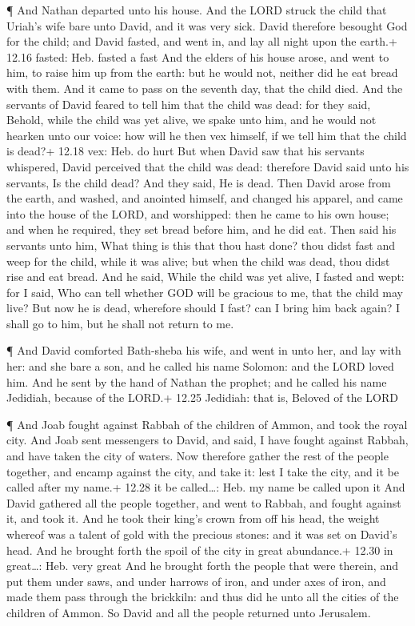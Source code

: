  ¶ And Nathan departed unto his house. And the LORD struck
the child that Uriah's wife bare unto David, and it was very sick.
 David therefore besought God for the child; and David
fasted, and went in, and lay all night upon the earth.+ 12.16 fasted:
Heb. fasted a fast  And the elders of his house arose, and
went to him, to raise him up from the earth: but he would not, neither
did he eat bread with them.  And it came to pass on the
seventh day, that the child died. And the servants of David feared to
tell him that the child was dead: for they said, Behold, while the child
was yet alive, we spake unto him, and he would not hearken unto our
voice: how will he then vex himself, if we tell him that the child is
dead?+ 12.18 vex: Heb. do hurt  But when David saw that his
servants whispered, David perceived that the child was dead: therefore
David said unto his servants, Is the child dead? And they said, He is
dead.  Then David arose from the earth, and washed, and
anointed himself, and changed his apparel, and came into the house of
the LORD, and worshipped: then he came to his own house; and when he
required, they set bread before him, and he did eat.  Then
said his servants unto him, What thing is this that thou hast done? thou
didst fast and weep for the child, while it was alive; but when the
child was dead, thou didst rise and eat bread.  And he
said, While the child was yet alive, I fasted and wept: for I said, Who
can tell whether GOD will be gracious to me, that the child may live?
 But now he is dead, wherefore should I fast? can I bring
him back again? I shall go to him, but he shall not return to me.

 ¶ And David comforted Bath-sheba his wife, and went in
unto her, and lay with her: and she bare a son, and he called his name
Solomon: and the LORD loved him.  And he sent by the hand
of Nathan the prophet; and he called his name Jedidiah, because of the
LORD.+ 12.25 Jedidiah: that is, Beloved of the LORD

 ¶ And Joab fought against Rabbah of the children of Ammon,
and took the royal city.  And Joab sent messengers to
David, and said, I have fought against Rabbah, and have taken the city
of waters.  Now therefore gather the rest of the people
together, and encamp against the city, and take it: lest I take the
city, and it be called after my name.+ 12.28 it be called\ldots: Heb. my
name be called upon it  And David gathered all the people
together, and went to Rabbah, and fought against it, and took it.
 And he took their king's crown from off his head, the
weight whereof was a talent of gold with the precious stones: and it was
set on David's head. And he brought forth the spoil of the city in great
abundance.+ 12.30 in great\ldots: Heb. very great  And he
brought forth the people that were therein, and put them under saws, and
under harrows of iron, and under axes of iron, and made them pass
through the brickkiln: and thus did he unto all the cities of the
children of Ammon. So David and all the people returned unto Jerusalem.


